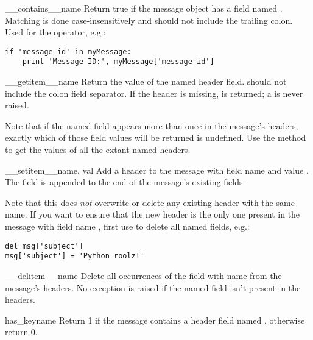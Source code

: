 \begin{methoddesc}[Message]{__contains__}{name}
Return true if the message object has a field named .
Matching is done case-insensitively and  should not include the
trailing colon.  Used for the  operator,
e.g.:

\begin{verbatim}
if 'message-id' in myMessage:
    print 'Message-ID:', myMessage['message-id']
\end{verbatim}
\end{methoddesc}

\begin{methoddesc}[Message]{__getitem__}{name}
Return the value of the named header field.   should not
include the colon field separator.  If the header is missing,
 is returned; a  is never raised.

Note that if the named field appears more than once in the message's
headers, exactly which of those field values will be returned is
undefined.  Use the  method to get the values of all
the extant named headers.
\end{methoddesc}

\begin{methoddesc}[Message]{__setitem__}{name, val}
Add a header to the message with field name  and value
.  The field is appended to the end of the message's existing
fields.

Note that this does \emph{not} overwrite or delete any existing header
with the same name.  If you want to ensure that the new header is the
only one present in the message with field name
, first use  to delete all named
fields, e.g.:

\begin{verbatim}
del msg['subject']
msg['subject'] = 'Python roolz!'
\end{verbatim}
\end{methoddesc}

\begin{methoddesc}[Message]{__delitem__}{name}
Delete all occurrences of the field with name  from the
message's headers.  No exception is raised if the named field isn't
present in the headers.
\end{methoddesc}

\begin{methoddesc}[Message]{has_key}{name}
Return 1 if the message contains a header field named ,
otherwise return 0.
\end{methoddesc}

